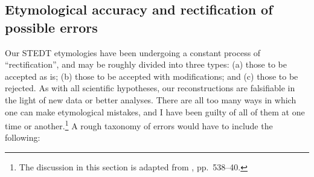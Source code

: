 



	
	
%



	
\subsection{Etymological accuracy and rectification of possible errors}

Our STEDT etymologies have been undergoing a constant process of “rectification”, and may be roughly divided into three types: (a) those to be accepted as is; (b) those to be accepted with modifications; and (c) those to be rejected. 
As with all scientific hypotheses, our reconstructions are falsifiable in the light of new data or better analyses. 
There are all too many ways in which one can make etymological mistakes, and
I have been guilty of all of them at one time or another.\footnote{The discussion in this section is adapted from \textit{}, pp.~538–40.} 
A rough taxonomy of
errors would have to include the following:


